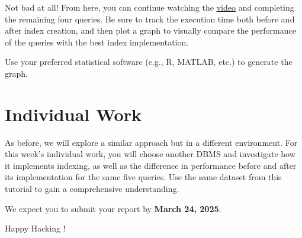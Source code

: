 \documentclass{article}
\begin{document}
Not bad at all! From here, you can continue watching the \href{https://youtu.be/clrtT_4WBAw?si=Q5Rmt7YVsykuS715}{video} and completing the remaining four queries. Be sure to track the execution time both before and after index creation, and then plot a graph to visually compare the performance of the queries with the best index implementation.

Use your preferred statistical software (e.g., R, MATLAB, etc.) to generate the graph.

\section{Individual Work}
As before, we will explore a similar approach but in a different environment. For this week's individual work, you will choose another DBMS and investigate how it implements indexing, as well as the difference in performance before and after its implementation for the same five queries. Use the same dataset from this tutorial to gain a comprehensive understanding.

We expect you to submit your report by \textbf{March 24, 2025}.

\vspace{5mm}
Happy Hacking \smiley!
\end{document}
